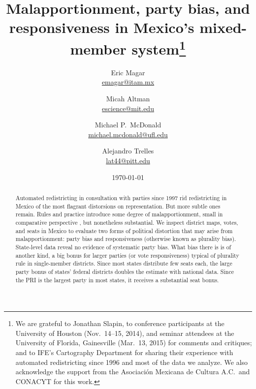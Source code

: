 \documentclass[letter,12pt]{article}
\begin{document}
\title{Malapportionment, party bias, and responsiveness in Mexico's mixed-member system\thanks{We are grateful to Jonathan Slapin, to conference participants at the University of Houston (Nov.~14--15, 2014), and seminar attendees at the University of Florida, Gainesville (Mar.~13, 2015) for comments and critiques; and to IFE's Cartography Department for sharing their experience with automated redistricting since 1996 and most of the data we analyze. We also acknowledge the support from the Asociaci\'on Mexicana de Cultura A.C.\ and CONACYT for this work.}}
\author{Eric Magar \\ {\footnotesize \url{emagar@itam.mx}} \and
        Micah Altman \\ {\footnotesize \url{escience@mit.edu}} \and
        Michael P.~McDonald \\ {\footnotesize \url{michael.mcdonald@ufl.edu}} \and  %
        Alejandro Trelles \\ {\footnotesize \url{lat44@pitt.edu}}
      }
\date{\today}
\maketitle

\begin{abstract}
\noindent Automated redistricting in consultation with parties since 1997 rid redistricting in Mexico of the most flagrant distorsions on representation. But more subtle ones remain. Rules and practice introduce some degree of malapportionment, small in comparative perspective \citep{samuels.snyder.2001}, but nonetheless substantial. We inspect district maps, votes, and seats in Mexico to evaluate two forms of political distortion that may arise from malapportionment: party bias and responsiveness (otherwise known as plurality bias). State-level data reveal no evidence of systematic party bias. What bias there is is of another kind, a big bonus for larger parties (or vote responsiveness) typical of plurality rule in single-member districts. Since most states distribute few seats each, the large party bonus of states' federal districts doubles the estimate with national data. Since the PRI is the largest party in most states, it receives a substantial seat bonus.
\end{abstract}
\end{document}
